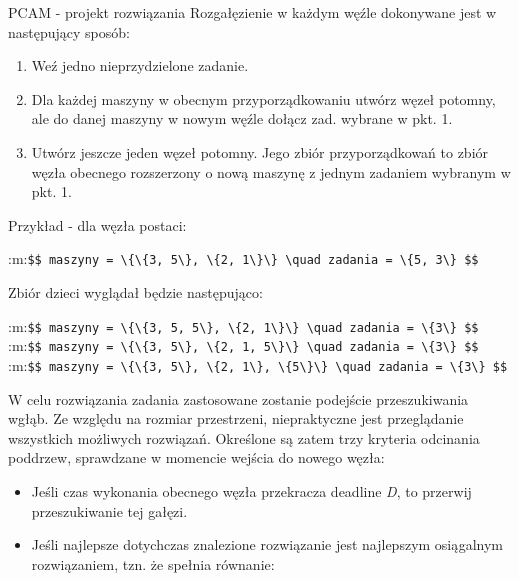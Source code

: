 \documentclass[ignorenonframetext,]{beamer}
\begin{document}
\begin{frame}[fragile]
\begin{block}{PCAM - projekt rozwiązania}
Rozgałęzienie w każdym węźle dokonywane jest w następujący sposób:

\begin{enumerate}[1.]
\item
  Weź jedno nieprzydzielone zadanie.
\item
  Dla każdej maszyny w obecnym przyporządkowaniu utwórz węzeł potomny,
  ale do danej maszyny w nowym węźle dołącz zad. wybrane w pkt. 1.
\item
  Utwórz jeszcze jeden węzeł potomny. Jego zbiór przyporządkowań to
  zbiór węzła obecnego rozszerzony o nową maszynę z jednym zadaniem
  wybranym w pkt. 1.
\end{enumerate}

Przykład - dla węzła postaci:

:m:\texttt{\$\$ maszyny = \textbackslash{}\{\textbackslash{}\{3, 5\textbackslash{}\}, \textbackslash{}\{2, 1\textbackslash{}\}\textbackslash{}\} \textbackslash{}quad zadania = \textbackslash{}\{5, 3\textbackslash{}\} \$\$}

Zbiór dzieci wyglądał będzie następująco:

:m:\texttt{\$\$ maszyny = \textbackslash{}\{\textbackslash{}\{3, 5, 5\textbackslash{}\}, \textbackslash{}\{2, 1\textbackslash{}\}\textbackslash{}\} \textbackslash{}quad zadania = \textbackslash{}\{3\textbackslash{}\} \$\$}
:m:\texttt{\$\$ maszyny = \textbackslash{}\{\textbackslash{}\{3, 5\textbackslash{}\}, \textbackslash{}\{2, 1, 5\textbackslash{}\}\textbackslash{}\} \textbackslash{}quad zadania = \textbackslash{}\{3\textbackslash{}\} \$\$}
:m:\texttt{\$\$ maszyny = \textbackslash{}\{\textbackslash{}\{3, 5\textbackslash{}\}, \textbackslash{}\{2, 1\textbackslash{}\}, \textbackslash{}\{5\textbackslash{}\}\textbackslash{}\} \textbackslash{}quad zadania = \textbackslash{}\{3\textbackslash{}\} \$\$}

W celu rozwiązania zadania zastosowane zostanie podejście przeszukiwania
wgłąb. Ze względu na rozmiar przestrzeni, niepraktyczne jest
przeglądanie wszystkich możliwych rozwiązań. Określone są zatem trzy
kryteria odcinania poddrzew, sprawdzane w momencie wejścia do nowego
węzła:

\begin{itemize}
\item
  Jeśli czas wykonania obecnego węzła przekracza deadline \emph{D}, to
  przerwij przeszukiwanie tej gałęzi.
\item
  Jeśli najlepsze dotychczas znalezione rozwiązanie jest najlepszym
  osiągalnym rozwiązaniem, tzn. że spełnia równanie:
\end{itemize}


\end{block}
\end{frame}
\end{document}
